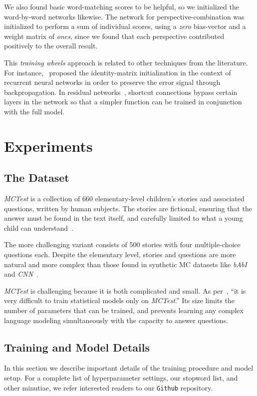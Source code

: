 \documentclass[11pt]{article}
\begin{document}
We also found basic word-matching scores to be helpful, so we initialized the word-by-word networks likewise. The network for perspective-combination was initialized to perform a sum of individual scores, using a {\it zero} bias-vector and a weight matrix of {\it ones}, since we found that each perspective contributed positively to the overall result.

This {\it training wheels} approach is related to other techniques from the literature. For instance,~ proposed the identity-matrix initialization in the context of recurrent neural networks in order to preserve the error signal through backpropagation. In residual networks~\cite{he2015}, shortcut connections bypass certain layers in the network so that a simpler function can be trained in conjunction with the full model.

\section{Experiments}
\label{sec:exp}
\subsection{The Dataset}
{\it MCTest} is a collection of 660 elementary-level children's stories and associated questions, written by human subjects. The stories are fictional, ensuring that the answer must be found in the text itself, and carefully limited to what a young child can understand~\cite{richardson2013}.

The more challenging variant consists of 500 stories with four multiple-choice questions each. Despite the elementary level, stories and questions are more natural and more complex than those found in synthetic MC datasets like {\it bAbI}~\cite{weston2014} and {\it CNN}~\cite{hermann2015}.





{\it MCTest} is challenging because it is both complicated and small. As per~, ``it is very difficult to train statistical models only on {\it MCTest}.'' Its size limits the number of parameters that can be trained, and prevents learning any complex language modeling simultaneously with the capacity to answer questions.

\subsection{Training and Model Details}
In this section we describe important details of the training procedure and model setup. For a complete list of hyperparameter settings, our stopword list, and other minutiae, we refer interested readers to our \texttt{Github} repository.
\end{document}
